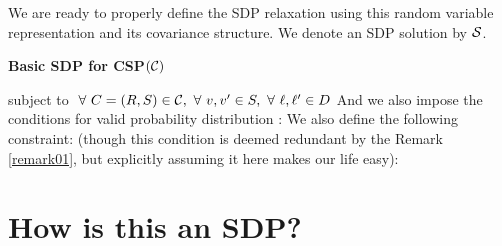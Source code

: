 We are ready to properly define the SDP relaxation using this random variable representation and its covariance structure.  
We denote an SDP solution by $\mathcal{S}$. 
\begin{definition}
{\bf Basic SDP for CSP$(\mathcal{C})$}  

subject to $\ \forall \  C = (R, S) \in \mathcal{C},\ \forall \  v, v' \in S, \ \forall \  \ell, \ell' \in D $
And we also impose the conditions for valid probability distribution : 
We also define the following constraint: (though this condition is deemed redundant by the Remark \ref{remark01}, but explicitly assuming it here makes our life easy): 
\end{definition}

\section{How is this an SDP?}

